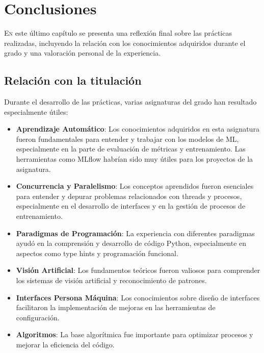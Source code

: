 \chapter{Conclusiones}
\label{chap:conclusions}

\lettrine{E}{n} este último capítulo se presenta una reflexión final sobre las prácticas realizadas, incluyendo la relación con los conocimientos adquiridos durante el grado y una valoración personal de la experiencia.

\section{Relación con la titulación}
\label{sec:titulacion}

Durante el desarrollo de las prácticas, varias asignaturas del grado han resultado especialmente útiles:

\begin{itemize}
    \item \textbf{Aprendizaje Automático}: Los conocimientos adquiridos en esta asignatura fueron fundamentales para entender y trabajar con los modelos de ML, especialmente en la parte de evaluación de métricas y entrenamiento. Las herramientas como MLflow habrían sido muy útiles para los proyectos de la asignatura.
    
    \item \textbf{Concurrencia y Paralelismo}: Los conceptos aprendidos fueron esenciales para entender y depurar problemas relacionados con threads y procesos, especialmente en el desarrollo de interfaces y en la gestión de procesos de entrenamiento.
    
    \item \textbf{Paradigmas de Programación}: La experiencia con diferentes paradigmas ayudó en la comprensión y desarrollo de código Python, especialmente en aspectos como type hints y programación funcional.
    
    \item \textbf{Visión Artificial}: Los fundamentos teóricos fueron valiosos para comprender los sistemas de visión artificial y reconocimiento de patrones.
    
    \item \textbf{Interfaces Persona Máquina}: Los conocimientos sobre diseño de interfaces facilitaron la implementación de mejoras en las herramientas de configuración.
    
    \item \textbf{Algoritmos}: La base algorítmica fue importante para optimizar procesos y mejorar la eficiencia del código.
\end{itemize}

